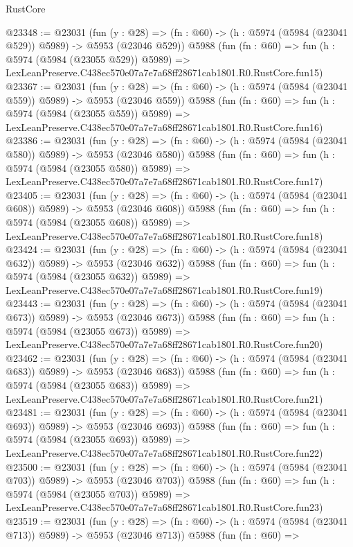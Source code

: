 \begin{lexlean}{RustCore}
\begin{coremodule}
@23348 := @23031
    (fun (y : @28) => (fn : @60) -> (h : @5974 (@5984 (@23041 @529)) @5989) -> @5953 (@23046 @529))
    @5988
    (fun (fn : @60) =>
    fun (h : @5974 (@5984 (@23055 @529)) @5989) =>
    LexLeanPreserve.C438ec570e07a7e7a68ff28671cab1801.R0.RustCore.fun15)
@23367 := @23031
    (fun (y : @28) => (fn : @60) -> (h : @5974 (@5984 (@23041 @559)) @5989) -> @5953 (@23046 @559))
    @5988
    (fun (fn : @60) =>
    fun (h : @5974 (@5984 (@23055 @559)) @5989) =>
    LexLeanPreserve.C438ec570e07a7e7a68ff28671cab1801.R0.RustCore.fun16)
@23386 := @23031
    (fun (y : @28) => (fn : @60) -> (h : @5974 (@5984 (@23041 @580)) @5989) -> @5953 (@23046 @580))
    @5988
    (fun (fn : @60) =>
    fun (h : @5974 (@5984 (@23055 @580)) @5989) =>
    LexLeanPreserve.C438ec570e07a7e7a68ff28671cab1801.R0.RustCore.fun17)
@23405 := @23031
    (fun (y : @28) => (fn : @60) -> (h : @5974 (@5984 (@23041 @608)) @5989) -> @5953 (@23046 @608))
    @5988
    (fun (fn : @60) =>
    fun (h : @5974 (@5984 (@23055 @608)) @5989) =>
    LexLeanPreserve.C438ec570e07a7e7a68ff28671cab1801.R0.RustCore.fun18)
@23424 := @23031
    (fun (y : @28) => (fn : @60) -> (h : @5974 (@5984 (@23041 @632)) @5989) -> @5953 (@23046 @632))
    @5988
    (fun (fn : @60) =>
    fun (h : @5974 (@5984 (@23055 @632)) @5989) =>
    LexLeanPreserve.C438ec570e07a7e7a68ff28671cab1801.R0.RustCore.fun19)
@23443 := @23031
    (fun (y : @28) => (fn : @60) -> (h : @5974 (@5984 (@23041 @673)) @5989) -> @5953 (@23046 @673))
    @5988
    (fun (fn : @60) =>
    fun (h : @5974 (@5984 (@23055 @673)) @5989) =>
    LexLeanPreserve.C438ec570e07a7e7a68ff28671cab1801.R0.RustCore.fun20)
@23462 := @23031
    (fun (y : @28) => (fn : @60) -> (h : @5974 (@5984 (@23041 @683)) @5989) -> @5953 (@23046 @683))
    @5988
    (fun (fn : @60) =>
    fun (h : @5974 (@5984 (@23055 @683)) @5989) =>
    LexLeanPreserve.C438ec570e07a7e7a68ff28671cab1801.R0.RustCore.fun21)
@23481 := @23031
    (fun (y : @28) => (fn : @60) -> (h : @5974 (@5984 (@23041 @693)) @5989) -> @5953 (@23046 @693))
    @5988
    (fun (fn : @60) =>
    fun (h : @5974 (@5984 (@23055 @693)) @5989) =>
    LexLeanPreserve.C438ec570e07a7e7a68ff28671cab1801.R0.RustCore.fun22)
@23500 := @23031
    (fun (y : @28) => (fn : @60) -> (h : @5974 (@5984 (@23041 @703)) @5989) -> @5953 (@23046 @703))
    @5988
    (fun (fn : @60) =>
    fun (h : @5974 (@5984 (@23055 @703)) @5989) =>
    LexLeanPreserve.C438ec570e07a7e7a68ff28671cab1801.R0.RustCore.fun23)
@23519 := @23031
    (fun (y : @28) => (fn : @60) -> (h : @5974 (@5984 (@23041 @713)) @5989) -> @5953 (@23046 @713))
    @5988
    (fun (fn : @60) =>

\end{coremodule}
\end{lexlean}
